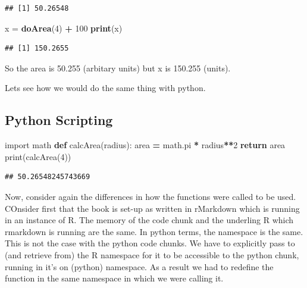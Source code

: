 \documentclass[]{book}
\newenvironment{Shaded}{\begin{snugshade}}{\end{snugshade}}
\newcommand{\KeywordTok}[1]{\textcolor[rgb]{0.13,0.29,0.53}{\textbf{#1}}}
\newcommand{\DecValTok}[1]{\textcolor[rgb]{0.00,0.00,0.81}{#1}}
\newcommand{\StringTok}[1]{\textcolor[rgb]{0.31,0.60,0.02}{#1}}
\newcommand{\ImportTok}[1]{#1}
\newcommand{\ControlFlowTok}[1]{\textcolor[rgb]{0.13,0.29,0.53}{\textbf{#1}}}
\newcommand{\OperatorTok}[1]{\textcolor[rgb]{0.81,0.36,0.00}{\textbf{#1}}}
\newcommand{\BuiltInTok}[1]{#1}
\newcommand{\NormalTok}[1]{#1}
\theoremstyle{definition}
\theoremstyle{definition}
\theoremstyle{definition}
\theoremstyle{remark}
\begin{document}
\begin{verbatim}
## [1] 50.26548
\end{verbatim}

\begin{Shaded}
\begin{Highlighting}[]
\NormalTok{x =}\StringTok{ }\KeywordTok{doArea}\NormalTok{(}\DecValTok{4}\NormalTok{) }\OperatorTok{+}\StringTok{ }\DecValTok{100}
\KeywordTok{print}\NormalTok{(x)}
\end{Highlighting}
\end{Shaded}

\begin{verbatim}
## [1] 150.2655
\end{verbatim}

So the area is 50.255 (arbitary units) but x is 150.255 (units).

Lets see how we would do the same thing with python.

\subsection{Python Scripting}\label{python-scripting-2}

\begin{Shaded}
\begin{Highlighting}[]
\ImportTok{import}\NormalTok{ math}
\KeywordTok{def}\NormalTok{ calcArea(radius):}
\NormalTok{  area }\OperatorTok{=}\NormalTok{ math.pi }\OperatorTok{*}\NormalTok{ radius}\OperatorTok{**}\DecValTok{2}
  \ControlFlowTok{return}\NormalTok{ area}
\BuiltInTok{print}\NormalTok{(calcArea(}\DecValTok{4}\NormalTok{))}
\end{Highlighting}
\end{Shaded}

\begin{verbatim}
## 50.26548245743669
\end{verbatim}

Now, consider again the differences in how the functions were called to
be used. COnsider first that the book is set-up as written in rMarkdown
which is running in an instance of R. The memory of the code chunk and
the underling R which rmarkdown is running are the same. In python
terms, the namespace is the same. This is not the case with the python
code chunks. We have to explicitly pass to (and retrieve from) the R
namespace  for it to be accessible to the python chunk,
running in it's on (python) namespace. As a result we had to redefine
the function in the same namespace in which we were calling it.
\end{document}
